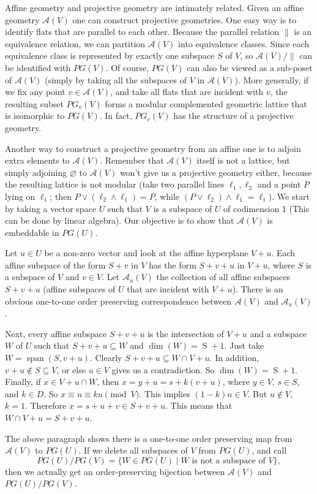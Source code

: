 \documentclass[12pt]{article}
\begin{document}
Affine geometry and projective geometry are intimately related.  Given an affine geometry $\mathcal{A}(V)$ one can construct projective geometries.  One easy way is to identify flats that are parallel to each other.  Because the parallel relation $\parallel$ is an equivalence relation, we can partition $\mathcal{A}(V)$ into equivalence classes.  Since each equivalence class is represented by exactly one subspace $S$ of $V$, so $\mathcal{A}(V)/\parallel$ can be identified with $PG(V)$.  Of course, $PG(V)$ can also be viewed as a sub-poset of $\mathcal{A}(V)$ (simply by taking all the subspaces of $V$ in $\mathcal{A}(V)$).  More generally, if we fix any point $v\in \mathcal{A}(V)$, and take all flats that are incident with $v$, the resulting subset $PG_v(V)$ forms a modular complemented geometric lattice that is isomorphic to $PG(V)$.  In fact, $PG_v(V)$ has the structure of a projective geometry.

Another way to construct a projective geometry from an affine one is to adjoin extra elements to $\mathcal{A}(V)$.  Remember that $\mathcal{A}(V)$ itself is not a lattice, but simply adjoining $\varnothing$ to $\mathcal{A}(V)$ won't give us a projective geometry either, because the resulting lattice is not modular (take two parallel lines $\ell_1,\ell_2$ and a point $P$ lying on $\ell_1$; then $P\vee (\ell_2\wedge \ell_1)=P$, while $(P\vee\ell_2)\wedge \ell_1=\ell_1$).  We start by taking a vector space $U$ such that $V$ is a subspace of $U$ of codimension 1 (This can be done by linear algebra).  Our objective is to show that $\mathcal{A}(V)$ is embeddable in $PG(U)$.

Let $u\in U$ be a non-zero vector and look at the affine hyperplane $V+u$.  Each affine subspace of the form $S+v$ in $V$ has the form $S+v+u$ in $V+u$, where $S$ is a subspace of $V$ and $v\in V$.  Let $\mathcal{A}_u(V)$ the collection of all affine subspaces $S+v+u$ (affine subspaces of $U$ that are incident with $V+u$).  There is an obvious one-to-one order preserving correspondence between $\mathcal{A}(V)$ and $\mathcal{A}_u(V)$.  

Next, every affine subspace $S+v+u$ is the intersection of $V+u$ and a subspace $W$ of $U$ such that $S+v+u\subseteq W$ and $\operatorname{dim}(W)= \operatorname{S}+1$.  Just take $W=\operatorname{span}(S,v+u)$.  Clearly $S+v+u\subseteq W\cap V+u$.  In addition, $v+u\notin S\subseteq V$, or else $u\in V$ gives us a contradiction.  So $\operatorname{dim}(W)= \operatorname{S}+1$.  Finally, if $x\in V+u\cap W$, then $x=y+u=s+k(v+u)$, where $y\in V$, $s\in S$, and $k\in D$.  So $x\equiv u\equiv ku \pmod V$.  This implies $(1-k)u\in V$.  But $u\notin V$, $k=1$.  Therefore $x=s+u+v\in S+v+u$.  This means that $W\cap V+u=S+v+u$.

The above paragraph shows there is a one-to-one order preserving map from $\mathcal{A}(V)$ to $PG(U)$.  If we delete all subspaces of $V$ from $PG(U)$, and call $$PG(U)/PG(V)=\lbrace W\in PG(U)\mid W\mbox{ is not a subspace of }V\rbrace,$$ then we actually get an order-preserving bijection between $\mathcal{A}(V)$ and $PG(U)/PG(V)$.
\end{document}
